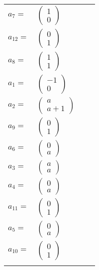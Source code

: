 \documentclass[1p]{elsarticle_modified}
\theoremstyle{definition}
\begin{document}
\begin{tabular}{m{7pt} m{180pt} m{7pt} m{180pt} }
\flushright $a_{7}=$&$\begin{pmatrix}1\\0\end{pmatrix}$ \\
\flushright $a_{12}=$&$\begin{pmatrix}0\\1\end{pmatrix}$ \\
\flushright $a_{8}=$&$\begin{pmatrix}1\\1\end{pmatrix}$ \\
\flushright $a_{1}=$&$\begin{pmatrix}-1\\0\end{pmatrix}$ \\
\flushright $a_{2}=$&$\begin{pmatrix}a\\a+1\end{pmatrix}$ \\
\flushright $a_{9}=$&$\begin{pmatrix}0\\1\end{pmatrix}$ \\
\flushright $a_{6}=$&$\begin{pmatrix}0\\a\end{pmatrix}$ \\
\flushright $a_{3}=$&$\begin{pmatrix}a\\a\end{pmatrix}$ \\
\flushright $a_{4}=$&$\begin{pmatrix}0\\a\end{pmatrix}$ \\
\flushright $a_{11}=$&$\begin{pmatrix}0\\1\end{pmatrix}$ \\
\flushright $a_{5}=$&$\begin{pmatrix}0\\a\end{pmatrix}$ \\
\flushright $a_{10}=$&$\begin{pmatrix}0\\1\end{pmatrix}$\\&\end{tabular}
\end{document}
